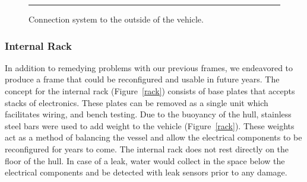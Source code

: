 \begin{figure}
\begin{center}
\vspace{.05in}
\hrule
\caption{Connection system to the outside of the vehicle.}\label{endplate}
\end{center}
\end{figure}

\subsubsection{Internal Rack}
In addition to remedying problems with our previous frames, we
endeavored to produce a frame that could be reconfigured and usable in
future years.  The concept for the internal rack (Figure~\ref{rack})
consists of base plates that accepts stacks of electronics.  These
plates can be removed as a single unit which facilitates wiring, and
bench testing.  Due to the buoyancy of the hull, stainless steel bars
were used to add weight to the vehicle (Figure~\ref{rack}).  These weights act as a method of balancing the
vessel and allow the electrical components to be reconfigured for
years to come.  The internal rack does not rest directly on the floor
of the hull.  In case of a leak, water would collect in the space
below the electrical components and be detected with leak sensors
prior to any damage.


